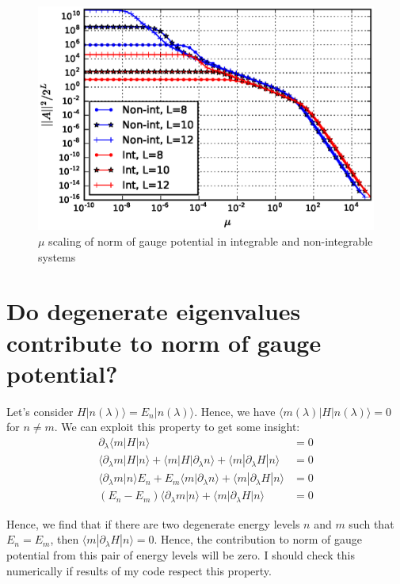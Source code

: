 \documentclass[11pt,a4paper]{article}
\begin{document}
\begin{figure}[h!]
\begin{center}
\includegraphics[scale=0.65]{new_v1_norm_L8_L10_L12.eps}
\caption{$\mu$ scaling of norm of gauge potential in integrable and non-integrable systems}
\end{center}
\end{figure}



\appendix
\section{Do degenerate eigenvalues contribute to norm of gauge potential?}\label{sec.deg}
Let's consider $H | n(\lambda) \rangle= E_n  | n(\lambda) \rangle $. Hence, we have $\langle m(\lambda)  |  H | n(\lambda) \rangle=0$ for $n\neq m$. We can exploit this property to get some insight:
\begin{align*}
\partial_{\lambda}\langle m  |  H | n\rangle&=0\\
\langle \partial_{\lambda} m |  H | n \rangle + \langle  m  |  H |\partial_{\lambda} n \rangle + \langle  m  | \partial_{\lambda} H | n \rangle&=0\\
\langle \partial_{\lambda} m   | n \rangle E_n + E_m\langle  m  |   \partial_{\lambda} n \rangle + \langle  m  | \partial_{\lambda} H | n \rangle&=0\\
(E_n - E_m)\langle  \partial_{\lambda} m  |    n \rangle + \langle  m  | \partial_{\lambda} H | n \rangle&=0
\end{align*}

Hence, we find that if there are two degenerate energy levels $n$ and $m$ such that $E_n=E_m$, then $\langle  m  | \partial_{\lambda} H | n \rangle=0$. Hence, the contribution to norm of gauge potential from this pair of energy levels will be zero. I should check this numerically if results of my code respect this property.


 


%
\end{document}

